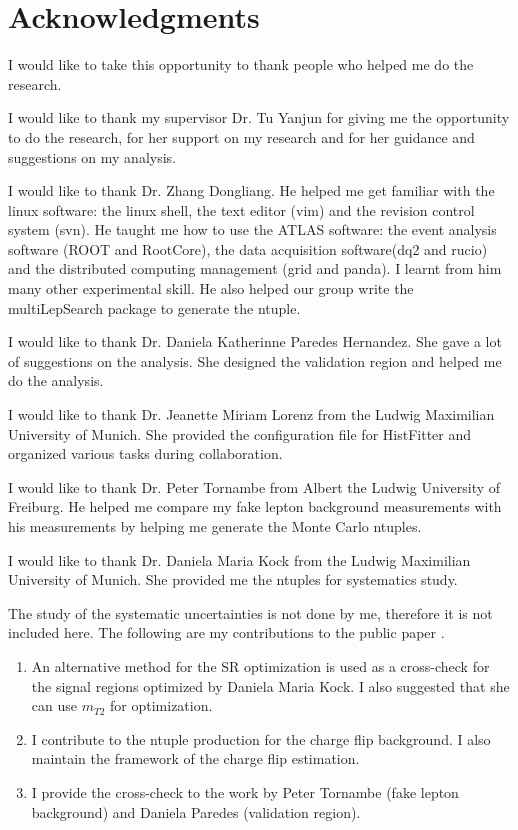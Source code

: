 
\chapter*{Acknowledgments}

I would like to take this opportunity to thank people who helped me do the research.

I would like to thank my supervisor Dr. Tu Yanjun for giving me the opportunity to do the research, for her support on my research and for her guidance and suggestions on my analysis.

I would like to thank Dr. Zhang Dongliang.
He helped me get familiar with the linux software: the linux shell, the text editor (vim) and the revision control system (svn).
He taught me how to use the ATLAS software: the event analysis software (ROOT and RootCore), the data acquisition software(dq2 and rucio) and the distributed computing management (grid and panda).
I learnt from him many other experimental skill.
He also helped our group write the multiLepSearch package to generate the ntuple.

I would like to thank Dr. Daniela Katherinne Paredes Hernandez.
She gave a lot of suggestions on the analysis.
She designed the validation region and helped me do the analysis.

I would like to thank Dr. Jeanette Miriam Lorenz from the Ludwig Maximilian University of Munich.
She provided the configuration file for HistFitter and organized various tasks during collaboration.

I would like to thank Dr. Peter Tornambe from Albert the Ludwig University of Freiburg.
He helped me compare my fake lepton background measurements with his measurements by helping me generate the Monte Carlo ntuples.

I would like to thank Dr. Daniela Maria Kock from the Ludwig Maximilian University of Munich.
She provided me the ntuples for systematics study.

The study of the systematic uncertainties is not done by me, therefore it is not included here.
The following are my contributions to the public paper \cite{Wh} \cite{WhSS}.
\begin{enumerate}
\item An alternative method for the SR optimization is used as a cross-check for the signal regions optimized by Daniela Maria Kock. I also suggested that she can use $m_{T2}$ for optimization.
\item I contribute to the ntuple production for the charge flip background. I also maintain the framework of the charge flip estimation.
\item I provide the cross-check to the work by Peter Tornambe (fake lepton background) and Daniela Paredes (validation region).
\end{enumerate}
